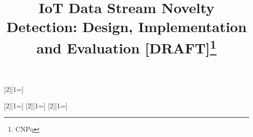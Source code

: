 \documentclass[conference]{lib/IEEEtran}
\newcounter{todocounter}
\begin{document}
\title{IoT Data Stream Novelty Detection:
Design, Implementation and Evaluation [DRAFT]\thanks{CNPq}}

\author{
}

\maketitle

\newcommand{\toreview}{}
\newcommand{\reffig}[1]{Figure \ref{fig:#1}\xspace}

\ifx\toreview\undefined
  [2][1=]{}
  \newcommand{\hl}[1]{}

  [2][1=]{}
  \newcommand{\hlhl}[1]{}
  [2][1=]{}
  \newcommand{\hlke}[1]{}
  [2][1=]{}
  \newcommand{\hlfa}[1]{}
\else
  \newcommand{\hl}[1]{\colorbox{red!25}{#1}}
  \newenvironment{highlight}{\begin{mdframed}[backgroundcolor=red!25]}{\end{mdframed}}

\end{document}
